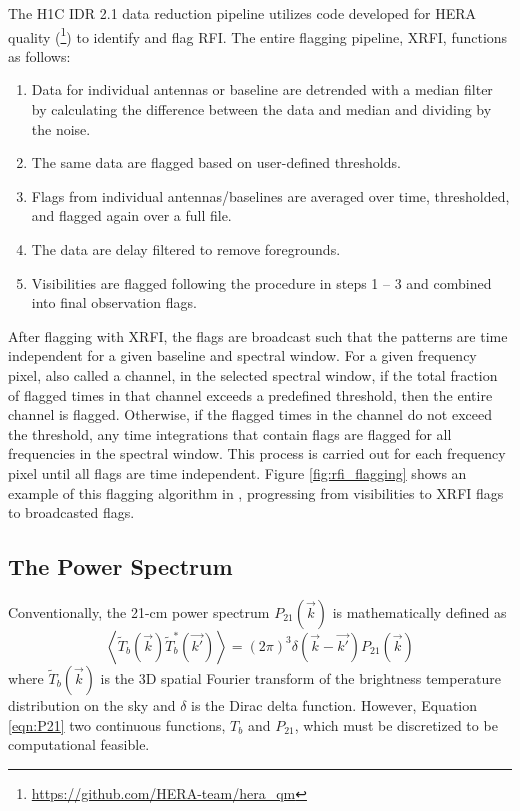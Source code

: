 \documentclass[12pt]{article}
\begin{document}
The H1C IDR 2.1 data reduction pipeline utilizes code developed for HERA quality  (\heraqm\footnote{\url{https://github.com/HERA-team/hera_qm}}) to identify and flag RFI. The entire flagging pipeline, XRFI, functions as follows:

\begin{enumerate}
	\item Data for individual antennas or baseline are detrended with a median filter by calculating the difference between the data and median and dividing by the noise.
	\item The same data are flagged based on user-defined thresholds.
	\item Flags from individual antennas/baselines are averaged over time, thresholded, and flagged again over a full file.
	\item The data are delay filtered to remove foregrounds. 
	\item Visibilities are flagged following the procedure in steps 1 -- 3 and combined into final observation flags.
\end{enumerate}

After flagging with XRFI, the flags are broadcast such that the patterns are time independent for a given baseline and spectral window. For a given frequency pixel, also called a channel, in the selected spectral window, if the total fraction of flagged times in that channel exceeds a predefined threshold, then the entire channel is flagged. Otherwise, if the flagged times in the channel do not exceed the threshold, any time integrations that contain flags are flagged for all frequencies in the spectral window. This process is carried out for each frequency pixel until all flags are time independent.  Figure \ref{fig:rfi_flagging} shows an example of this flagging algorithm in , progressing from visibilities to XRFI flags to broadcasted flags.


\subsection{The Power Spectrum} \label{subsec:calc_ps}

Conventionally, the 21-cm power spectrum $P_{21}\left(\vec{k}\right)$ is mathematically defined as
\begin{equation}
\left\langle \widetilde{T}_b\left(\vec{k}\right) \widetilde{T}_b^*\left(\vec{k'}\right) \right\rangle = \left(2\pi\right)^3 \delta\left(\vec{k} - \vec{k'}\right) P_{21}\left(\vec{k}\right)
\label{eqn:P21}
\end{equation}
where $\widetilde{T}_b\left(\vec{k}\right)$ is the 3D spatial Fourier transform of the brightness temperature distribution on the sky and $\delta$ is the Dirac delta function. However, Equation \ref{eqn:P21}  two continuous functions, $T_b$ and $P_{21}$, which must be discretized to be computational feasible.
\end{document}
